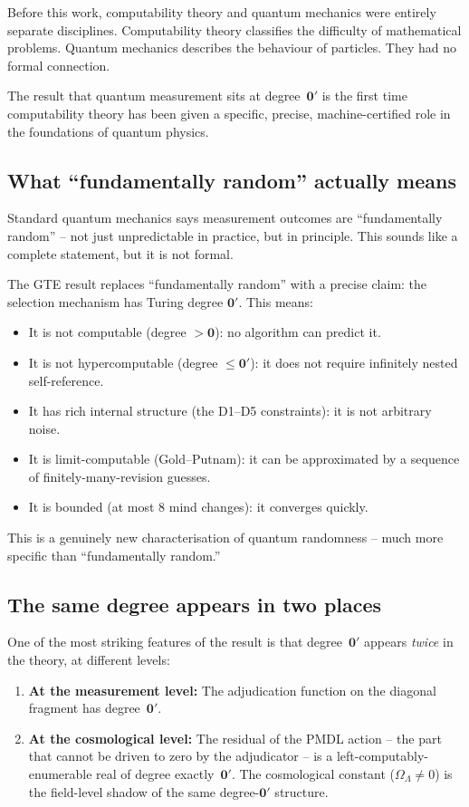 \documentclass[11pt,a4paper]{article}
\newcommand{\zerp}{\mathbf{0}'}
\newcommand{\zer}{\mathbf{0}}
\begin{document}
Before this work, computability theory and quantum mechanics were entirely
separate disciplines.  Computability theory classifies the difficulty of
mathematical problems.  Quantum mechanics describes the behaviour of particles.
They had no formal connection.

The result that quantum measurement sits at degree~$\zerp$ is the first time
computability theory has been given a specific, precise, machine-certified
role in the foundations of quantum physics.

\subsection{What ``fundamentally random'' actually means}

Standard quantum mechanics says measurement outcomes are ``fundamentally
random'' -- not just unpredictable in practice, but in principle.  This
sounds like a complete statement, but it is not formal.

The GTE result replaces ``fundamentally random'' with a precise claim:
the selection mechanism has Turing degree $\zerp$.  This means:
\begin{itemize}
  \item It is not computable (degree $> \zer$): no algorithm can predict it.
  \item It is not hypercomputable (degree $\leq \zerp$): it does not require
    infinitely nested self-reference.
  \item It has rich internal structure (the D1--D5 constraints): it is not
    arbitrary noise.
  \item It is limit-computable (Gold--Putnam): it can be approximated by a
    sequence of finitely-many-revision guesses.
  \item It is bounded (at most 8 mind changes): it converges quickly.
\end{itemize}

This is a genuinely new characterisation of quantum randomness -- much more
specific than ``fundamentally random.''

\subsection{The same degree appears in two places}

One of the most striking features of the result is that degree~$\zerp$
appears \emph{twice} in the theory, at different levels:

\begin{enumerate}
  \item \textbf{At the measurement level:} The adjudication function on the
    diagonal fragment has degree~$\zerp$.
  \item \textbf{At the cosmological level:} The residual of the PMDL action
    -- the part that cannot be driven to zero by the adjudicator -- is a
    left-computably-enumerable real of degree exactly~$\zerp$.  The
    cosmological constant ($\Omega_\Lambda \neq 0$) is the field-level shadow
    of the same degree-$\zerp$ structure.
\end{enumerate}
\end{document}
